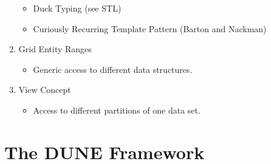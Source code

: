 \documentclass[aspectratio=169,11pt]{beamer}
\theoremstyle{definition}
\begin{document}
\begin{frame}
\begin{minipage}{0.65\textwidth-1ex}
\begin{enumerate}
\begin{itemize}
        \item Duck Typing (see STL)
        \item Curiously Recurring Template Pattern (Barton and Nackman)
        \end{itemize}
      \item Grid Entity Ranges
        \begin{itemize}
        \item Generic access to different data structures.
        \end{itemize}
      \item View Concept
        \begin{itemize}
        \item Access to different partitions of one data set.
        \end{itemize}
      \end{enumerate}
  \end{minipage}
\end{frame}

\section{The DUNE Framework}
\end{document}
